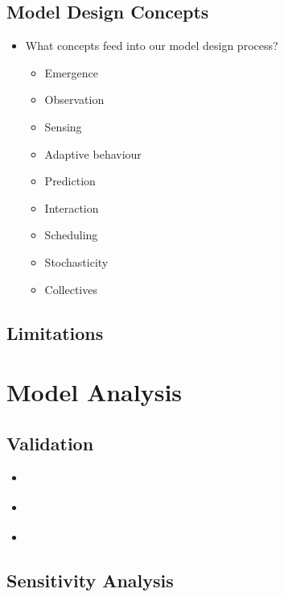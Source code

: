\documentclass[11pt,a4paper]{article}
\begin{document}
\subsection{Model Design Concepts}
\label{sub:abms:design}

\begin{itemize}
    \item What concepts feed into our model design process?
        \citep{railsback2011agent}
        \begin{itemize}
            \item Emergence
            \item Observation
            \item Sensing
            \item Adaptive behaviour
            \item Prediction
            \item Interaction
            \item Scheduling
            \item Stochasticity
            \item Collectives
        \end{itemize}
\end{itemize}

\subsection{Limitations}
\label{sub:abms:limitations}

\section{Model Analysis}
\label{sec:analysis}

\subsection{Validation}
\label{sub:analysis:validation}

\begin{itemize}
    \item \citep{xiang2005verification}
    \item \citep{klugl2008validation}
    \item \citep{ormerod2009validation}
\end{itemize}

\subsection{Sensitivity Analysis}
\label{sub:analysis:sensitivity}
\end{document}
